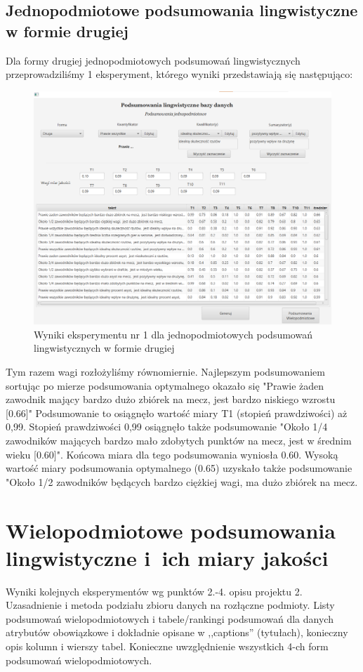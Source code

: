 \documentclass{classrep}
\begin{document}
\subsection{Jednopodmiotowe podsumowania lingwistyczne w formie drugiej}

Dla formy drugiej jednopodmiotowych podsumowań lingwistycznych przeprowadziliśmy 1 eksperyment, którego wyniki przedstawiają się następująco:
\begin{figure}[H]
    \centering
    \includegraphics[width = 14cm]{eksperyment3.png}
    \caption{Wyniki eksperymentu nr 1 dla jednopodmiotowych podsumowań lingwistycznych w formie drugiej}
    \label{rysunek:forma_druga_eksperyment_1}
\end{figure}

Tym razem wagi rozłożyliśmy równomiernie. Najlepszym podsumowaniem sortując po mierze podsumowania optymalnego okazało się "Prawie żaden zawodnik mający bardzo dużo zbiórek na mecz, jest bardzo niskiego wzrostu [0.66]" Podsumowanie to osiągnęło wartość miary T1 (stopień prawdziwości) aż 0,99. Stopień prawdziwości 0,99 osiągnęło także podsumowanie "Około 1/4 zawodników mających bardzo mało zdobytych punktów na mecz, jest w średnim wieku [0.60]". Końcowa miara dla tego podsumowania wyniosła 0.60. Wysoką wartość miary podsumowania optymalnego (0.65) uzyskało także podsumowanie "Około 1/2 zawodników będących bardzo ciężkiej wagi, ma dużo zbiórek na mecz.



\section{Wielopodmiotowe podsumowania lingwistyczne i~ich miary jakości} 
Wyniki kolejnych eksperymentów wg punktów 2.-4. opisu projektu 2. Uzasadnienie i
metoda podziału zbioru danych na rozłączne podmioty. Listy podsumowań
wielopodmiotowych i tabele/rankingi podsumowań dla danych atrybutów obowiązkowe i
dokładnie opisane w ,,captions'' (tytułach), konieczny opis kolumn i wierszy tabel.
Konieczne uwzględnienie wszystkich 4-ch form podsumowań wielopodmiotowych. 
\\ 
\end{document}
